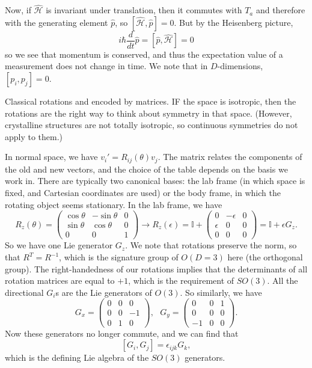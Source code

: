 \documentclass[fontsize=12pt]{scrartcl}
\newcommand{\bb}[1]{\mathbb{#1}}
\newcommand{\Id}{\bb{I}}
\newcommand{\mom}{\hat{p}}
\newcommand{\Ham}{\hat{\mathcal{H}}}
\begin{document}
Now, if $\Ham$ is invariant under translation, then it commutes with $T_a$ and therefore with the generating element $\mom$, so $[\Ham,\mom]=0$. But by the Heisenberg picture, $$i\hbar \frac{d}{dt}\mom=[\mom,\Ham]=0$$ so we see that momentum is conserved, and thus the expectation value of a measurement does not change in time. We note that in $D$-dimensions, $[p_i,p_j]=0$.

Classical rotations and encoded by matrices. IF the space is isotropic, then the rotations are the right way to think about symmetry in that space. (However, crystalline structures are not totally isotropic, so continuous symmetries do not apply to them.)

In normal space, we have $v_i'=R_{ij}(\theta)v_j$. The matrix relates the components of the old and new vectors, and the choice of the table depends on the basis we work in. There are typically two canonical bases: the lab frame (in which space is fixed, and Cartesian coordinates are used) or the body frame, in which the rotating object seems stationary. In the lab frame, we have $$R_z(\theta)=\left(\begin{matrix}
\cos\theta & -\sin\theta & 0\\
\sin\theta & \cos\theta & 0\\
0 & 0 & 1
\end{matrix}\right) \to R_z(\epsilon)=\Id+\left(\begin{matrix}
0 & - \epsilon & 0\\ \epsilon & 0 & 0\\ 0&0&0
\end{matrix}\right)=\Id+\epsilon G_z.$$ So we have one Lie generator $G_z$. We note that rotations preserve the norm, so that $R^T=R^{-1}$, which is the signature group of $O(D=3)$ here (the orthogonal group). The right-handedness of our rotations implies that the determinants of all rotation matrices are equal to $+1$, which is the requirement of $SO(3)$. All the directional $G_i$s are the Lie generators of $O(3)$. So similarly, we have $$G_x=\left(\begin{matrix}
0 & 0 & 0\\ 0 & 0 & -1\\ 0&1&0
\end{matrix}\right), \ \ \ G_y=\left(\begin{matrix}
0 & 0 & 1\\ 0 & 0 & 0\\ -1&0&0
\end{matrix}\right). $$ Now these generators no longer commute, and we can find that $$[G_i, G_j]=\epsilon_{ijk}G_k,$$ which is the defining Lie algebra of the $SO(3)$ generators.
\end{document}
